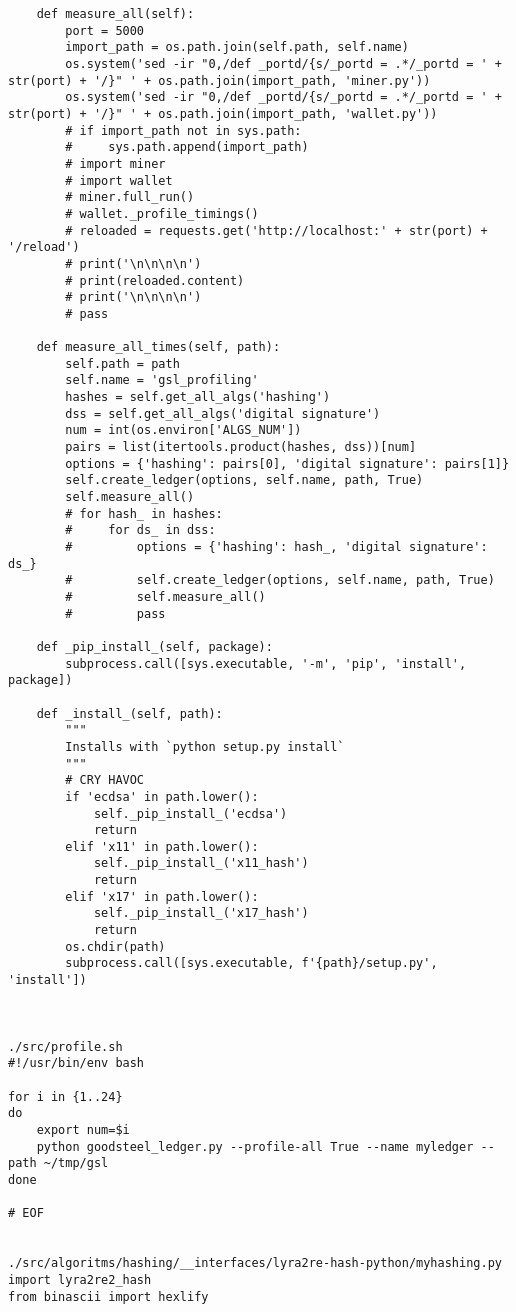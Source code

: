 \begin{lstlisting}
    def measure_all(self):
        port = 5000
        import_path = os.path.join(self.path, self.name)
        os.system('sed -ir "0,/def _portd/{s/_portd = .*/_portd = ' + str(port) + '/}" ' + os.path.join(import_path, 'miner.py'))
        os.system('sed -ir "0,/def _portd/{s/_portd = .*/_portd = ' + str(port) + '/}" ' + os.path.join(import_path, 'wallet.py'))
        # if import_path not in sys.path:
        #     sys.path.append(import_path)
        # import miner
        # import wallet
        # miner.full_run()
        # wallet._profile_timings()
        # reloaded = requests.get('http://localhost:' + str(port) + '/reload')
        # print('\n\n\n\n')
        # print(reloaded.content)
        # print('\n\n\n\n')
        # pass

    def measure_all_times(self, path):
        self.path = path
        self.name = 'gsl_profiling'
        hashes = self.get_all_algs('hashing')
        dss = self.get_all_algs('digital signature')
        num = int(os.environ['ALGS_NUM'])
        pairs = list(itertools.product(hashes, dss))[num]
        options = {'hashing': pairs[0], 'digital signature': pairs[1]}
        self.create_ledger(options, self.name, path, True)
        self.measure_all()
        # for hash_ in hashes:
        #     for ds_ in dss:
        #         options = {'hashing': hash_, 'digital signature': ds_}
        #         self.create_ledger(options, self.name, path, True)
        #         self.measure_all()
        #         pass

    def _pip_install_(self, package):
        subprocess.call([sys.executable, '-m', 'pip', 'install', package])

    def _install_(self, path):
        """
        Installs with `python setup.py install`
        """
        # CRY HAVOC
        if 'ecdsa' in path.lower():
            self._pip_install_('ecdsa')
            return
        elif 'x11' in path.lower():
            self._pip_install_('x11_hash')
            return
        elif 'x17' in path.lower():
            self._pip_install_('x17_hash')
            return
        os.chdir(path)
        subprocess.call([sys.executable, f'{path}/setup.py', 'install'])



./src/profile.sh
#!/usr/bin/env bash

for i in {1..24}
do
    export num=$i
    python goodsteel_ledger.py --profile-all True --name myledger --path ~/tmp/gsl
done

# EOF


./src/algoritms/hashing/__interfaces/lyra2re-hash-python/myhashing.py
import lyra2re2_hash
from binascii import hexlify


\end{lstlisting}
